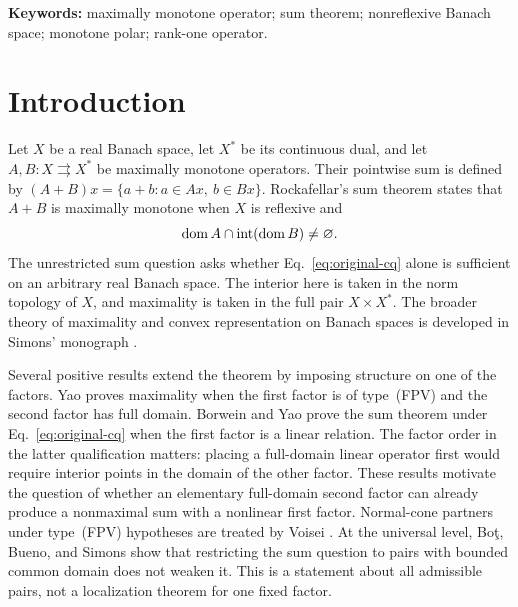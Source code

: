 \noindent\textbf{Keywords:} maximally monotone operator; sum theorem;
nonreflexive Banach space; monotone polar; rank-one operator.

\section{Introduction}
\label{sec:introduction}
Let $X$ be a real Banach space, let $X^*$ be its continuous dual, and let
$A,B:X\rightrightarrows X^*$ be maximally monotone operators. Their pointwise
sum is defined by $(A+B)x=\{a+b:a\in Ax,\ b\in Bx\}$. Rockafellar's sum
theorem \cite{rockafellar1970} states that $A+B$ is maximally monotone when
$X$ is reflexive and
\begin{equation}
\operatorname{dom} A\cap\operatorname{int}(\operatorname{dom} B)\ne\varnothing.
\label{eq:original-cq}
\end{equation}
The unrestricted sum question asks whether Eq.~\eqref{eq:original-cq}
alone is sufficient on an arbitrary real Banach space. The interior here
is taken in the norm topology of $X$, and maximality is taken in the full
pair $X\times X^*$.
The broader theory of maximality and convex representation on Banach
spaces is developed in Simons' monograph \cite{simons2008}.

Several positive results extend the theorem by imposing structure on one
of the factors. Yao \cite{yao2010} proves maximality when the first factor
is of type~(FPV) and the second factor has full domain. Borwein and Yao
\cite{borweinyao2012} prove the sum theorem under
Eq.~\eqref{eq:original-cq} when the first factor is a linear relation.
The factor order in the latter qualification matters: placing a
full-domain linear operator first would require interior points in the
domain of the other factor. These results motivate the question of
whether an elementary full-domain second factor can already produce a
nonmaximal sum with a nonlinear first factor.
Normal-cone partners under type~(FPV) hypotheses are treated by Voisei
\cite{voisei2010}. At the universal level, Bo\c{t}, Bueno, and Simons
\cite{botbuenosimons2016} show that restricting the sum question to pairs
with bounded common domain does not weaken it. This is a statement about
all admissible pairs, not a localization theorem for one fixed factor.

